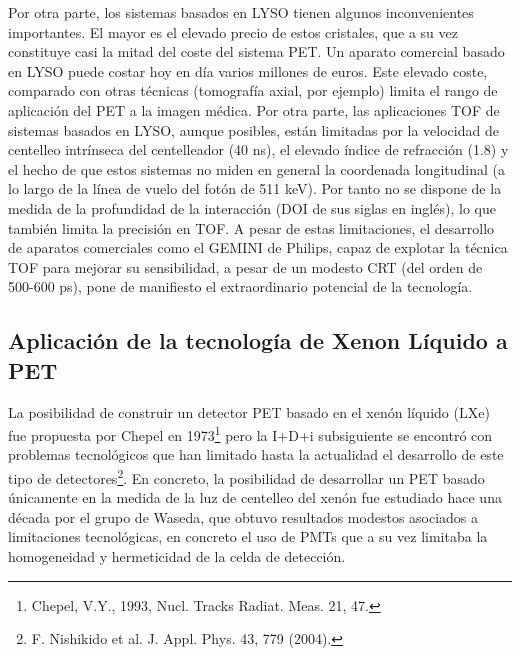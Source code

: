Por otra parte, los sistemas basados en LYSO tienen algunos inconvenientes importantes. El mayor es el elevado precio de estos cristales, que a su vez constituye casi la mitad del coste del sistema PET. Un aparato comercial basado en LYSO puede costar hoy en día varios millones de euros. Este elevado coste, comparado con otras técnicas (tomografía axial, por ejemplo) limita el rango de aplicación del PET a la imagen médica. Por otra parte, las aplicaciones TOF de sistemas basados en LYSO, aunque posibles, están limitadas por la velocidad de centelleo intrínseca del centelleador (40 ns), el elevado índice de refracción (1.8)  y el hecho de que estos sistemas no miden en general la coordenada longitudinal (a lo largo de la línea de vuelo del fotón de 511 keV). Por tanto no se dispone de la medida de la profundidad de la interacción (DOI de sus siglas en inglés), lo que también limita la precisión en TOF. A pesar de estas limitaciones, el desarrollo de aparatos comerciales como el GEMINI de Philips, capaz de explotar la técnica TOF para mejorar su sensibilidad, a pesar de un modesto CRT (del orden de 500-600 ps), pone de manifiesto el extraordinario potencial de la tecnología.

\subsection*{Aplicación de la tecnología de Xenon Líquido a PET}

La posibilidad de construir un detector PET basado en el xenón líquido (LXe) fue propuesta por Chepel en 1973\footnote{Chepel, V.Y., 1993, Nucl. Tracks Radiat. Meas. 21, 47.}  pero la I+D+i subsiguiente se encontró con problemas tecnológicos que han limitado hasta la actualidad el desarrollo de este tipo de detectores\footnote{F. Nishikido et al. J. Appl. Phys. 43, 779 (2004).}. En concreto, la posibilidad de desarrollar un PET basado únicamente en la medida de la luz de centelleo del xenón fue estudiado hace una década por el grupo de Waseda, que obtuvo resultados modestos asociados a limitaciones tecnológicas, en concreto el uso de PMTs que a su vez limitaba la homogeneidad y hermeticidad de la celda de detección. 

